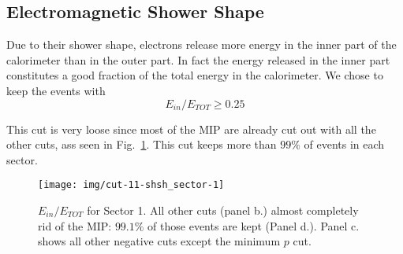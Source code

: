 \subsection{Electromagnetic Shower Shape}
Due to their shower shape, electrons release more energy in
the inner part of the calorimeter than in the outer part. In
fact the energy released in the inner part constitutes a good
fraction of the total energy in the calorimeter.
We chose to keep the events with $$E_{in}/E_{TOT} \geq 0.25$$

This cut is very loose since most of the MIP are already cut
out with all the other cuts, ass seen in Fig.~\ref{fig:einetot}.
This cut keeps more than $99\%$ of events in each sector.


\begin{figure}[ht]
    \centering
    \texttt{[image: img/cut-11-shsh\_sector-1]}
    \caption{$E_{in}/E_{TOT}$ for Sector 1. All other cuts (panel b.)
        almost completely rid of the MIP: $99.1\%$ of those events are kept (Panel d.).
        Panel c. shows all other negative cuts except the minimum $p$ cut.}
    \label{fig:einetot}
\end{figure}

